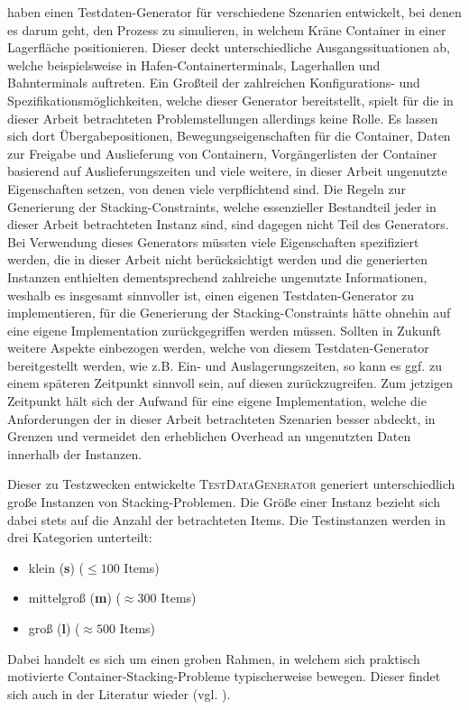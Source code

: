 \citet{Briskorn2018} haben einen Testdaten-Generator für verschiedene Szenarien entwickelt, bei denen
es darum geht, den Prozess zu simulieren, in welchem Kräne Container in einer Lagerfläche positionieren.
Dieser deckt unterschiedliche Ausgangssituationen ab, welche beispielsweise in Hafen-Containerterminals,
Lagerhallen und Bahnterminals auftreten.
Ein Großteil der zahlreichen Konfigurations- und Spezifikationsmöglichkeiten, welche dieser
Generator bereitstellt, spielt für die in dieser Arbeit betrachteten Problemstellungen allerdings keine Rolle.
Es lassen sich dort Übergabepositionen, Bewegungseigenschaften für die Container, Daten zur Freigabe und Auslieferung von
Containern, Vorgängerlisten der Container basierend auf Auslieferungszeiten und viele weitere, in dieser Arbeit
ungenutzte Eigenschaften setzen, von denen viele verpflichtend sind. Die Regeln zur Generierung der Stacking-Constraints,
welche essenzieller Bestandteil jeder in dieser Arbeit betrachteten Instanz sind, sind dagegen nicht Teil des Generators.
Bei Verwendung dieses Generators müssten viele Eigenschaften spezifiziert werden, die in dieser Arbeit nicht
berücksichtigt werden und die generierten Instanzen enthielten dementsprechend zahlreiche ungenutzte Informationen,
weshalb es insgesamt sinnvoller ist, einen eigenen Testdaten-Generator zu implementieren, für die Generierung der
Stacking-Constraints hätte ohnehin auf eine eigene Implementation zurückgegriffen werden müssen.
Sollten in Zukunft weitere Aspekte einbezogen werden, welche von diesem Testdaten-Generator bereitgestellt
werden, wie z.B. Ein- und Auslagerungszeiten, so kann es ggf. zu einem späteren Zeitpunkt sinnvoll
sein, auf diesen zurückzugreifen. Zum jetzigen Zeitpunkt hält sich der Aufwand für eine eigene Implementation,
welche die Anforderungen der in dieser Arbeit betrachteten Szenarien besser abdeckt, in Grenzen und vermeidet den
erheblichen Overhead an ungenutzten Daten innerhalb der Instanzen.

Dieser zu Testzwecken entwickelte \textsc{TestDataGenerator} generiert unterschiedlich große Instanzen von Stacking-Problemen.
Die Größe einer Instanz bezieht sich dabei stets auf die Anzahl der betrachteten Items. Die Testinstanzen werden
in drei Kategorien unterteilt:
\begin{itemize}
  \item klein (\textbf{s}) ($\leq 100$ Items)
  \item mittelgroß (\textbf{m}) ($\approx 300$ Items)
  \item groß (\textbf{l}) ($\approx 500$ Items)\newline
\end{itemize}
Dabei handelt es sich um einen groben Rahmen, in welchem sich praktisch motivierte Container-Stacking-Probleme
typischerweise bewegen. Dieser findet sich auch in der Literatur wieder (vgl. \citet{Le2016}).

